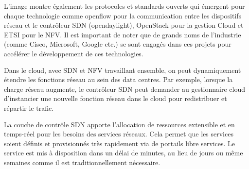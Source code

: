 L'image montre également les protocoles et standards ouverts qui émergent pour chaque technologie comme \gls{openflow} pour la communication entre les dispositifs réseau et le contrôleur SDN (\gls{opendaylight}), OpenStack pour la gestion Cloud et ETSI pour le NFV. Il est important de noter que de grands noms de l’industrie (comme Cisco, Microsoft, Google etc.) se sont engagés dans ces projets pour accélérer le développement de ces technologies.

Dans le cloud, avec SDN et NFV travaillant ensemble, on peut dynamiquement étendre les fonctions réseau au sein des data centres. Par exemple, lorsque la charge réseau augmente, le contrôleur SDN peut demander au gestionnaire cloud d'instancier une nouvelle fonction réseau dans le cloud pour redistribuer et répartir le trafic. 



La couche de contrôle SDN apporte l'allocation de ressources extensible et en temps-réel pour les besoins des services réseaux. Cela permet que les services soient définis et provisionnés très rapidement via de portails libre services. Le service est mis à disposition dans un délai de minutes, au lieu de jours ou même semaines comme il est traditionnellement nécessaire.

